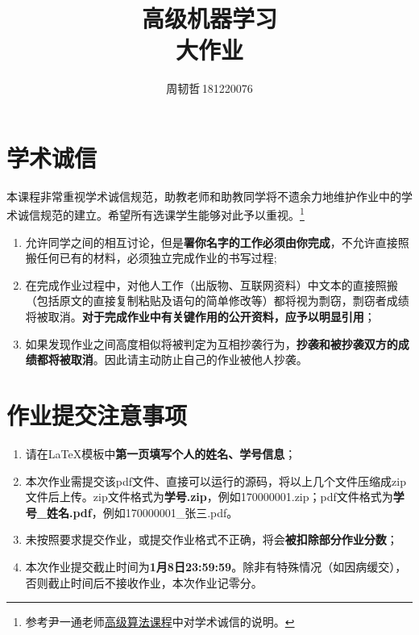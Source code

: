 \documentclass[a4paper,UTF8]{article}
\numberwithin{equation}{section}
\begin{document}
\title{高级机器学习\\
大作业}
\author{周韧哲\,181220076} 
\maketitle

\section*{学术诚信}

本课程非常重视学术诚信规范，助教老师和助教同学将不遗余力地维护作业中的学术诚信规范的建立。希望所有选课学生能够对此予以重视。\footnote{参考尹一通老师\href{http://tcs.nju.edu.cn/wiki/}{高级算法课程}中对学术诚信的说明。}

\begin{tcolorbox}
	\begin{enumerate}
		\item[(1)] 允许同学之间的相互讨论，但是{\color{red}\textbf{署你名字的工作必须由你完成}}，不允许直接照搬任何已有的材料，必须独立完成作业的书写过程;
		\item[(2)] 在完成作业过程中，对他人工作（出版物、互联网资料）中文本的直接照搬（包括原文的直接复制粘贴及语句的简单修改等）都将视为剽窃，剽窃者成绩将被取消。{\color{red}\textbf{对于完成作业中有关键作用的公开资料，应予以明显引用}}；
		\item[(3)] 如果发现作业之间高度相似将被判定为互相抄袭行为，{\color{red}\textbf{抄袭和被抄袭双方的成绩都将被取消}}。因此请主动防止自己的作业被他人抄袭。
	\end{enumerate}
\end{tcolorbox}

\section*{作业提交注意事项}
\begin{tcolorbox}
	\begin{enumerate}
		\item[(1)] 请在LaTeX模板中{\color{red}\textbf{第一页填写个人的姓名、学号信息}}；
		\item[(2)] 本次作业需提交该pdf文件、直接可以运行的源码，将以上几个文件压缩成zip文件后上传。zip文件格式为{\color{red}\textbf{学号.zip}}，例如170000001.zip；pdf文件格式为{\color{red}\textbf{学号\_姓名.pdf}}，例如170000001\_张三.pdf。
		\item[(3)] 未按照要求提交作业，或提交作业格式不正确，将会{\color{red}\textbf{被扣除部分作业分数}}；
		\item[(4)] 本次作业提交截止时间为{\color{red}\textbf{1月8日23:59:59}}。除非有特殊情况（如因病缓交），否则截止时间后不接收作业，本次作业记零分。
	\end{enumerate}
\end{tcolorbox}
\end{document}
